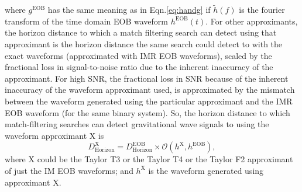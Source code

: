 \documentclass[aps,
prd,
amsmath,
amssymb,
twocolumn,
floatfix,
groupedaddress]{revtex4-1}
\newcommand{\D}{\mathrm{d}}
\newcommand{\eff}{\mathrm{eff}}
\newcommand{\EOB}{\mathrm{EOB}}
\newcommand{\Olap}{\mathcal{O}}
\newcommand{\X}{\mathrm{X}}
\newcommand{\horizon}{\mathrm{Horizon}}
\def\l({\left(}
\def\r){\right)}
\begin{document}
where $g^{\EOB}$ has the same meaning as in Eqn.\eqref{eq:handg} if $\tilde{h}(f)$ is the fourier transform of the time domain EOB waveform $h^{\EOB}(t)$. For other approximants, the horizon distance to which a match filtering search can detect using that approximant is the horizon distance the same search could detect to with the exact waveforms (approximated with IMR EOB waveforms), scaled by the fractional loss in signal-to-noise ratio due to the inherent inaccuracy of the approximant. For high SNR, the fractional loss in SNR because of the inherent inaccuracy of the waveform approximant used, is approximated by the mismatch between the waveform generated using the particular approximant and the IMR EOB waveform (for the same binary system). So, the horizon distance to which match-filtering searches can detect gravitational wave signals to using the waveform approximant $\X$ is
\begin{equation}\label{eq:DeffPN}
D^{\X}_{\horizon} = D^{\EOB}_{\horizon}\times\Olap(h^{\X},h^{\EOB}),
\end{equation}
where $\X$ could be the Taylor T3 or the Taylor T4 or the Taylor F2 approximant of just the IM EOB waveforms; and $h^{\X}$ is the waveform generated using approximant $\X$.
%
\end{document}
